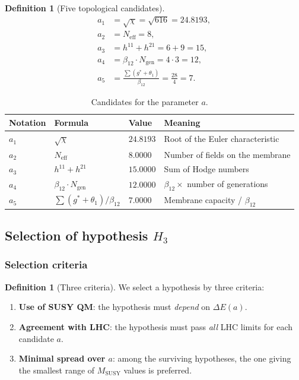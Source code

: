 \documentclass[11pt,a4paper]{article}
\theoremstyle{definition}
\newtheorem{definition}[theorem]{Definition}
\begin{document}
\begin{definition}[Five topological candidates]
\label{def:five-a}
\begin{align}
    a_1 &= \sqrt{\chi} = \sqrt{616} = 24.8193, \\
    a_2 &= N_{\text{eff}} = 8, \\
    a_3 &= h^{11} + h^{21} = 6 + 9 = 15, \\
    a_4 &= \beta_{12} \cdot N_{\text{gen}} = 4 \cdot 3 = 12, \\
    a_5 &= \frac{\sum(g^* + \theta_1)}{\beta_{12}} = \frac{28}{4} = 7.
\end{align}
\end{definition}

\begin{table}[ht]
\centering
\caption{Candidates for the parameter \texorpdfstring{$a$}{a}.}
\label{tab:a-candidates-main}
\begin{tabular}{llll}
\toprule
Notation & Formula & Value & Meaning \\
\midrule
$a_1$ & $\sqrt{\chi}$ & $24.8193$ & Root of the Euler characteristic \\
$a_2$ & $N_{\text{eff}}$ & $8.0000$ & Number of fields on the membrane \\
$a_3$ & $h^{11} + h^{21}$ & $15.0000$ & Sum of Hodge numbers \\
$a_4$ & $\beta_{12} \cdot N_{\text{gen}}$ & $12.0000$ & $\beta_{12} \times$ number of generations \\
$a_5$ & $\sum(g^* + \theta_1)/\beta_{12}$ & $7.0000$ & Membrane capacity / $\beta_{12}$ \\
\bottomrule
\end{tabular}
\end{table}

\subsection{Selection of hypothesis \texorpdfstring{$H_3$}{H\_3}}
\label{subsec:susy-selection}

\subsubsection{Selection criteria}

\begin{definition}[Three criteria]
\label{def:three-criteria}
We select a hypothesis by three criteria:
\begin{enumerate}
    \item \textbf{Use of SUSY QM}: the hypothesis must
          \emph{depend} on $\Delta E(a)$.
    \item \textbf{Agreement with LHC}: the hypothesis must pass
          \emph{all} LHC limits for each candidate $a$.
    \item \textbf{Minimal spread over $a$}: among the surviving
          hypotheses, the one giving the smallest
          range of $M_{\text{SUSY}}$ values is preferred.
\end{enumerate}
\end{definition}
\end{document}
